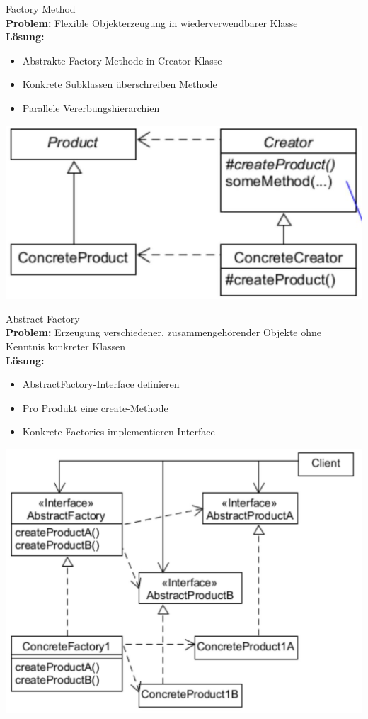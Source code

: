 \begin{concept}{Factory Method}\\
\textbf{Problem:} Flexible Objekterzeugung in wiederverwendbarer Klasse\\
\textbf{Lösung:}
\begin{itemize}
    \item Abstrakte Factory-Methode in Creator-Klasse
    \item Konkrete Subklassen überschreiben Methode
    \item Parallele Vererbungshierarchien
\end{itemize}
\includegraphics[width=0.6\linewidth]{images/2025_01_02_73d93f10fa91ab6123dcg-16}
\end{concept}

\begin{concept}{Abstract Factory}\\
\textbf{Problem:} Erzeugung verschiedener, zusammengehörender Objekte ohne Kenntnis konkreter Klassen\\
\textbf{Lösung:}
\begin{itemize}
    \item AbstractFactory-Interface definieren
    \item Pro Produkt eine create-Methode
    \item Konkrete Factories implementieren Interface
\end{itemize}
\includegraphics[width=0.8\linewidth]{images/2025_01_02_73d93f10fa91ab6123dcg-13}
\end{concept}

